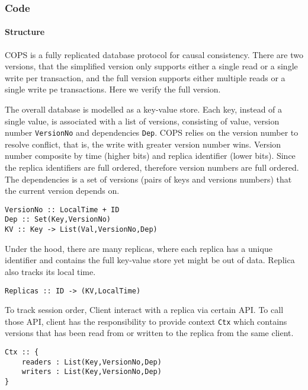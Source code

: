 \subsubsection{Code}
\paragraph{\bf Structure}
COPS is a fully replicated database protocol for causal consistency.
There are two versions, 
that the simplified version only supports either a single read or a single write per transaction, 
and the full version supports either multiple reads or a single write pe transactions.
Here we verify the full version.

The overall database is modelled as a key-value store.
Each key, instead of a single value, is associated with a list of versions,
consisting of value, version number \verb|VersionNo| and dependencies \verb|Dep|.
COPS relies on the version number to resolve conflict,
that is, the write with greater version number wins.
Version number composite by time (higher bits) and replica identifier (lower bits).
Since the replica identifiers are full ordered, therefore version numbers are full ordered.
The dependencies is a set of versions (pairs of keys and versions numbers)
that the current version depends on.

\begin{lstlisting}[caption={COPS Structure},label={lst:cops-structure}]
VersionNo :: LocalTime + ID
Dep :: Set(Key,VersionNo)
KV :: Key -> List(Val,VersionNo,Dep)
\end{lstlisting}

Under the hood, there are many replicas,
where each replica has a unique identifier
and contains the full key-value store yet might be out of data.
Replica also tracks its local time.

\begin{lstlisting}[caption={COPS Replicas},label={lst:cops-replica}]
Replicas :: ID -> (KV,LocalTime)
\end{lstlisting}

To track session order, Client interact with a replica via certain API.
To call those API,
client has the responsibility to provide context \verb|Ctx| 
which contains versions that has been read from or written to the replica from the same client.

\begin{lstlisting}[caption={Client context},label={lst:cops-client-ctx}]
Ctx :: {
    readers : List(Key,VersionNo,Dep)
    writers : List(Key,VersionNo,Dep)
}
\end{lstlisting}

